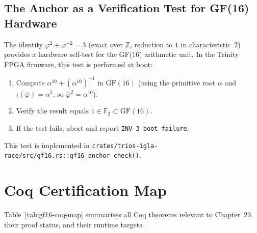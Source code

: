 \subsection{The Anchor as a Verification Test for GF(16) Hardware}

The identity \(\varphi^2+\varphi^{-2}=3\) (exact over \(\mathbb{Z}\),
reduction to \(1\) in characteristic~2) provides a hardware self-test for
the GF(16) arithmetic unit.
In the Trinity FPGA firmware, this test is performed at boot:

\begin{enumerate}
  \item Compute \(\alpha^{10} + (\alpha^{10})^{-1}\) in \(\mathrm{GF}(16)\)
        (using the primitive root \(\alpha\) and \(\iota(\bar\varphi)=\alpha^5\),
        so \(\bar\varphi^2=\alpha^{10}\)).
  \item Verify the result equals \(1\in\mathbb{F}_2\subset\mathrm{GF}(16)\).
  \item If the test fails, abort and report \texttt{INV-3 boot failure}.
\end{enumerate}

This test is implemented in
\texttt{crates/trios-igla-race/src/gf16.rs::gf16\_anchor\_check()}.

\section{Coq Certification Map}
\label{sec:gf16-coq}

Table~\ref{tab:gf16-coq-map} summarises all Coq theorems relevant to
Chapter~23, their proof status, and their runtime targets.

